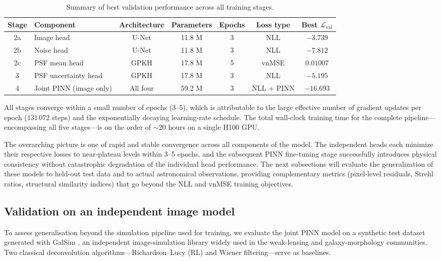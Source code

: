 \documentclass{aa}
\begin{document}
\begin{table}[h]
\centering
\begin{tabular}{|c|l|c|c|c|c|c|}
\hline
\textbf{Stage} & \textbf{Component} & \textbf{Architecture} & \textbf{Parameters} & \textbf{Epochs} & \textbf{Loss type} & \textbf{Best $\mathcal{L}_\mathrm{val}$} \\
\hline
2a & Image head & U-Net & 11.8 M & 3 & NLL & $-3.739$ \\
2b & Noise head & U-Net & 11.8 M & 3 & NLL & $-7.812$ \\
2c & PSF mean head & GPKH & 17.8 M & 5 & vnMSE & $0.01007$ \\
3 & PSF uncertainty head & GPKH & 17.8 M & 3 & NLL & $-5.195$ \\
4 & Joint PINN (image only) & All four & 59.2 M & 3 & NLL + PINN & $-16.693$ \\
\hline
\end{tabular}
\caption{Summary of best validation performance across all training stages.}
\label{tab:summary}
\end{table}

All stages converge within a small number of epochs ($3$--$5$), which is attributable to the large effective number of gradient updates per epoch ($131\,072$ steps) and the exponentially decaying learning-rate schedule. The total wall-clock training time for the complete pipeline---encompassing all five stages---is on the order of $\sim 20$ hours on a single H100 GPU.

The overarching picture is one of rapid and stable convergence across all components of the model. The independent heads each minimize their respective losses to near-plateau levels within 3--5 epochs, and the subsequent PINN fine-tuning stage successfully introduces physical consistency without catastrophic degradation of the individual head performance. The next subsections will evaluate the generalization of these models to held-out test data and to actual astronomical observations, providing complementary metrics (pixel-level residuals, Strehl ratios, structural similarity indices) that go beyond the NLL and vnMSE training objectives.

\subsection{Validation on an independent image model}

To assess generalisation beyond the simulation pipeline used for training, we evaluate the joint PINN model on a synthetic test dataset generated with GalSim \citep{2015A&C....10..121R}, an independent image-simulation library widely used in the weak-lensing and galaxy-morphology communities. Two classical deconvolution algorithms---Richardson--Lucy (RL) and Wiener filtering---serve as baselines.
\end{document}

